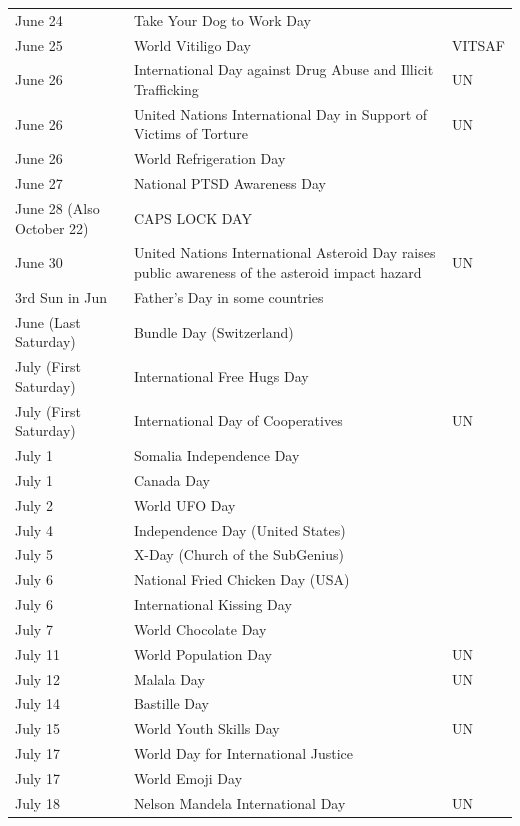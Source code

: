 \documentclass[
  openany]{book}
\begin{document}
\begin{longtable}[t]{>{\raggedright\arraybackslash}p{8em}>{\raggedright\arraybackslash}p{18em}>{\raggedright\arraybackslash}p{10em}}
June 24 & Take Your Dog to Work Day & \\
\rowcolor{gray!6}  June 25 & World Vitiligo Day & VITSAF\\
June 26 & International Day against Drug Abuse and Illicit Trafficking & UN\\
\addlinespace
\rowcolor{gray!6}  June 26 & United Nations International Day in Support of Victims of Torture & UN\\
June 26 & World Refrigeration Day & \\
\rowcolor{gray!6}  June 27 & National PTSD Awareness Day & \\
June 28 (Also October 22) & CAPS LOCK DAY & \\
\rowcolor{gray!6}  June 30 & United Nations International Asteroid Day raises public awareness of the asteroid impact hazard & UN\\
\addlinespace
3rd Sun in Jun & Father's Day in some countries & \\
\rowcolor{gray!6}  June (Last Saturday) & Bundle Day (Switzerland) & \\
July (First Saturday) & International Free Hugs Day & \\
\rowcolor{gray!6}  July (First Saturday) & International Day of Cooperatives & UN\\
July 1 & Somalia Independence Day & \\
\addlinespace
\rowcolor{gray!6}  July 1 & Canada Day & \\
July 2 & World UFO Day & \\
\rowcolor{gray!6}  July 4 & Independence Day (United States) & \\
July 5 & X-Day (Church of the SubGenius) & \\
\rowcolor{gray!6}  July 6 & National Fried Chicken Day (USA) & \\
\addlinespace
July 6 & International Kissing Day & \\
\rowcolor{gray!6}  July 7 & World Chocolate Day & \\
July 11 & World Population Day & UN\\
\rowcolor{gray!6}  July 12 & Malala Day & UN\\
July 14 & Bastille Day & \\
\addlinespace
\rowcolor{gray!6}  July 15 & World Youth Skills Day & UN\\
July 17 & World Day for International Justice & \\
\rowcolor{gray!6}  July 17 & World Emoji Day & \\
July 18 & Nelson Mandela International Day & UN\\

\end{longtable}
\end{document}

